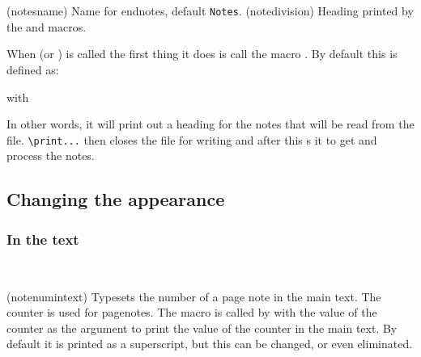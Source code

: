 
\begin{syntax}
\cmd{\notesname} \\
\cmd{\notedivision} \\
\end{syntax}
\glossary(notesname)%
  {}%
  {Name for endnotes, default \texttt{Notes}.}%
\glossary(notedivision)%
  {}%
  {Heading printed by the  and  macros.}

  When \cmd{\printpagenotes} (or \cmd{\printpagenotes*}) is called the
  first thing it does is call the macro \cmd{\notedivision}. By
  default this is defined as:
\begin{lcode}
\newcommand*{\notedivision}{\chapter{\notesname}}
\end{lcode}
with
\begin{lcode}
  \newcommand*{\notesname}{Notes}
\end{lcode}
In other words, it will print out a heading for the notes that will be read
from the  file. \verb?\print...? then closes the  file 
for writing and after this \verb??s it to get and process the notes.


\subsection{Changing the appearance}

\subsubsection{In the text}
\label{sec:in-the-text}


\begin{syntax}
\cmd{\notenumintext} \\
\end{syntax}
\glossary(notenumintext)%
  {}%
  {Typesets the number  of a page note in the main text.}%
The  counter is used for pagenotes. The macro
\cmd{\notenumintext} is called by \cmd{\pagenote} with the value of the
 counter as the  argument to print the
value of the  counter in the main text. By default it is 
printed as a 
superscript, but this can be changed, or even eliminated.
\begin{lcode}
\newcommand*{\notenumintext}[1]{\textsuperscript{#1}}
\end{lcode}

